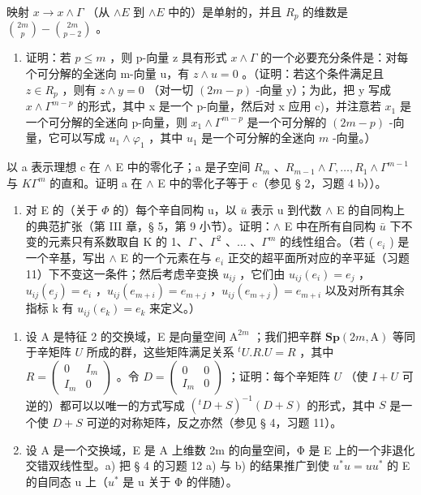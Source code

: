 映射 \(x \to x \wedge \Gamma\) （从 \(\wedge E\) 到 \(\wedge E\) 中的）是单射的，并且 \(R_p\) 的维数是 \(\binom{2m}{p} - \binom{2m}{p-2}\) 。

\begin{enumerate}
\def\labelenumi{\alph{enumi})}
\setcounter{enumi}{5}
\tightlist
\item
  证明：若 \(p \leqslant m\) ，则 p-向量 z 具有形式 \(x \wedge \Gamma\) 的一个必要充分条件是：对每个可分解的全迷向 m-向量 u，有 \(z \wedge u = 0\) 。（证明：若这个条件满足且 \(z \in R_{p}\) ，则有 \(z \wedge y = 0\) （对一切 \((2m - p)\) -向量 y）；为此，把 y 写成 \(x \wedge \Gamma^{m-p}\) 的形式，其中 x 是一个 p-向量，然后对 x 应用 c)，并注意若 \(x_{1}\) 是一个可分解的全迷向 p-向量，则 \(x_{1} \wedge \Gamma^{m-p}\) 是一个可分解的 \((2m - p)\) -向量，它可以写成 \(u_{1} \wedge \varphi_{1}\) ，其中 \(u_{1}\) 是一个可分解的全迷向 \(m\) -向量。）
\end{enumerate}

以 a 表示理想 c 在 \(\wedge\) E 中的零化子；a 是子空间 \(R_{m}\) 、\(R_{m-1} \wedge \Gamma, \ldots, R_{1} \wedge \Gamma^{m-1}\) 与 \(K\Gamma^{m}\) 的直和。证明 a 在 \(\wedge\) E 中的零化子等于 c（参见 § 2，习题 4 b））。

\begin{enumerate}
\def\labelenumi{\alph{enumi})}
\setcounter{enumi}{6}
\tightlist
\item
  对 E 的（关于 \(\Phi\) 的）每个辛自同构 u，以 \(\bar{u}\) 表示 u 到代数 \(\wedge\) E 的自同构上的典范扩张（第 III 章，§ 5，第 9 小节）。证明：\(\wedge\) E 中在所有自同构 \(\bar{u}\) 下不变的元素只有系数取自 K 的 1、\(\Gamma\) 、\(\Gamma^{2}\) 、\(\ldots\) 、\(\Gamma^{m}\) 的线性组合。（若 ( \(e_{i}\) ) 是一个辛基，写出 \(\wedge\) E 的一个元素在与 \(e_{i}\) 正交的超平面所对应的辛平延（习题 11）下不变这一条件；然后考虑辛变换 \(u_{ij}\) ，它们由 \(u_{ij}(e_{i}) = e_{j}\) ，\(u_{ij}(e_{j}) = e_{i}\) ，\(u_{ij}(e_{m+i}) = e_{m+j}\) ，\(u_{ij}(e_{m+j}) = e_{m+i}\) 以及对所有其余指标 k 有 \(u_{ij}(e_{k}) = e_{k}\) 来定义。）
\end{enumerate}

\begin{enumerate}
\def\labelenumi{\arabic{enumi})}
\setcounter{enumi}{13}
\item
  设 A 是特征 2 的交换域，E 是向量空间 \(\mathrm{A}^{2m}\) ；我们把辛群 \(\mathbf{Sp}(2m,\mathrm{A})\) 等同于辛矩阵 \(U\) 所成的群，这些矩阵满足关系 \(^t U.R.U = R\) ，其中 \(R = \left( \begin{array}{cc}0 & I_m\\ I_m & 0 \end{array} \right)\) 。令 \(D = \left( \begin{array}{cc}0 & 0\\ I_m & 0 \end{array} \right)\) ；证明：每个辛矩阵 \(U\) （使 \(I + U\) 可逆的）都可以以唯一的方式写成 \((^t D + S)^{-1}(D + S)\) 的形式，其中 \(S\) 是一个使 \(D + S\) 可逆的对称矩阵，反之亦然（参见 § 4，习题 11）。
\item
  设 A 是一个交换域，E 是 A 上维数 2m 的向量空间，Φ 是 E 上的一个非退化交错双线性型。a) 把 § 4 的习题 12 a) 与 b) 的结果推广到使 \(u^{*}u = uu^{*}\) 的 E 的自同态 u 上（\(u^{*}\) 是 u 关于 Φ 的伴随）。
\end{enumerate}

